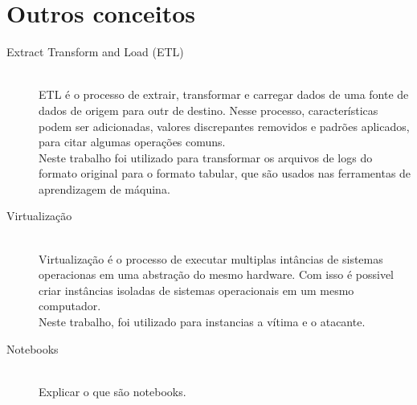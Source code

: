 \section{Outros conceitos}

\begin{description}
    \item[Extract Transform and Load (ETL)] \hfill \\ ETL é o processo de extrair, transformar 
    e carregar dados de uma fonte de dados de origem para outr de destino. Nesse processo, 
    características podem ser adicionadas, valores discrepantes removidos e padrões aplicados,
    para citar algumas operações comuns. \\ 
    Neste trabalho foi utilizado para transformar os arquivos de logs do formato original para 
    o formato tabular, que são usados nas ferramentas de aprendizagem de máquina.
    \item[Virtualização] \hfill \\ Virtualização é o processo de executar multiplas intâncias 
    de sistemas operacionas em uma abstração do mesmo hardware. Com isso é possivel 
    criar instâncias isoladas de sistemas operacionais em um mesmo computador. \\
    Neste trabalho, foi utilizado para instancias a vítima e o atacante.
    \item[Notebooks] \hfill \\ Explicar o que são notebooks.
\end{description}